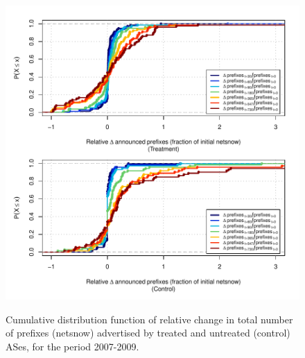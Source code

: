 \clearpage
\vspace*{16pt}
\begin{figure}[H]
\begin{centering}
\begin{singlespace}
\captionsetup{list=no}
    \includegraphics[width=6in]{figures/behavior-rel_netsnow-2007_2009-corr.pdf}
    \vspace{-2em}\\
    \caption{Cumulative distribution function of relative change in total
    number of prefixes (netsnow) advertised by treated and untreated (control)
    ASes, for the period 2007-2009.}
\end{singlespace}
\end{centering}
\end{figure}


